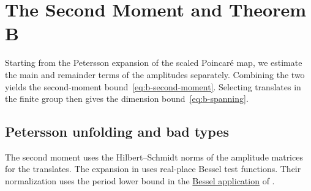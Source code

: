 \chapter{The Second Moment and Theorem B}
\label{chap:spanning}

\begin{chapterguide}
Starting from the Petersson expansion of the scaled Poincaré map, we estimate the main and remainder terms of the amplitudes separately. Combining the two yields the second-moment bound~\eqref{eq:b-second-moment}. Selecting translates in the finite group then gives the dimension bound~\eqref{eq:b-spanning}.
\end{chapterguide}

\section{Petersson unfolding and bad types}
\label{sec:b-amplitude}

The second moment uses the Hilbert--Schmidt norms of the amplitude matrices for the translates. The expansion in  uses real-place Bessel test functions. Their normalization uses the period lower bound in the \hyperref[use:ch8-bessel]{Bessel application} of .

